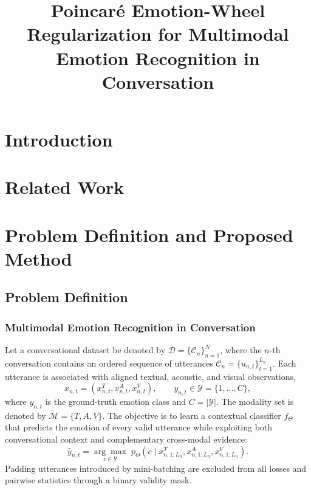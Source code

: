 \documentclass[letterpaper,journal]{IEEEtran}
\begin{document}
\title{Poincar\'e Emotion-Wheel Regularization for Multimodal Emotion Recognition in Conversation}
\author{}
\maketitle

\begin{abstract}
\end{abstract}

\section{Introduction}
\label{sec:introduction}

\section{Related Work}
\label{sec:related_work}

\section{Problem Definition and Proposed Method}
\label{sec:problem_and_method}

\subsection{Problem Definition}
\label{subsec:problem_definition}

\subsubsection{Multimodal Emotion Recognition in Conversation}

Let a conversational dataset be denoted by
\(\mathcal{D}=\{\mathcal{C}_{n}\}_{n=1}^{N}\), where the \(n\)-th
conversation contains an ordered sequence of utterances
\(\mathcal{C}_{n}=\{u_{n,t}\}_{t=1}^{L_n}\).
Each utterance is associated with aligned textual, acoustic, and visual
observations,
\begin{equation}
    x_{n,t}=\left(x_{n,t}^{T},x_{n,t}^{A},x_{n,t}^{V}\right),
    \qquad
    y_{n,t}\in\mathcal{Y}=\{1,\ldots,C\},
    \label{eq:problem_input}
\end{equation}
where \(y_{n,t}\) is the ground-truth emotion class and
\(C=|\mathcal{Y}|\). The modality set is denoted by
\(\mathcal{M}=\{T,A,V\}\). The objective is to learn a contextual classifier
\(f_{\Theta}\) that predicts the emotion of every valid utterance while
exploiting both conversational context and complementary cross-modal evidence:
\begin{equation}
    \hat{y}_{n,t}
    =\underset{c\in\mathcal{Y}}{\arg\max}\;
    p_{\Theta}\!\left(c\mid
    x_{n,1:L_n}^{T},x_{n,1:L_n}^{A},x_{n,1:L_n}^{V}\right).
    \label{eq:problem_prediction}
\end{equation}
Padding utterances introduced by mini-batching are excluded from all losses
and pairwise statistics through a binary validity mask.
\end{document}
